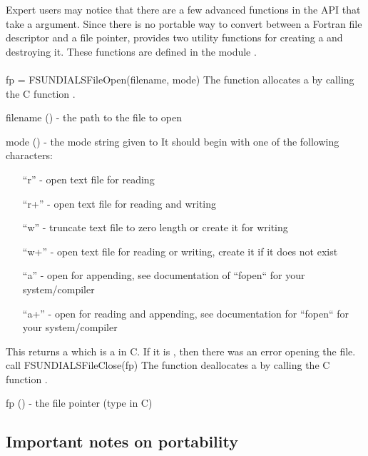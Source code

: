 Expert {\sundials} users may notice that there are a few advanced functions in the {\sundials}
{\CC} API that take a  argument. Since there is no portable way to convert between
a Fortran file descriptor and a {\CC} file pointer, {\sundials} provides two utility functions
for creating a  and destroying it. These functions are defined in the module
.
\\
\\
{
  fp = FSUNDIALSFileOpen(filename, mode)
}
{
  The function allocates a  by calling the C function .
}
{
  \begin{args}[filename]
  \item[filename] () - the path to the file to open
  \item[mode] () - the mode string given to 
    It should begin with one of the following characters:
    \begin{itemize}
      \item[] ``r'' - open text file for reading
      \item[] ``r+'' - open text file for reading and writing
      \item[] ``w''  - truncate text file to zero length or create it for writing
      \item[] ``w+'' - open text file for reading or writing, create it if it does not exist
      \item[] ``a''  - open for appending, see documentation of ``fopen`` for your system/compiler
      \item[] ``a+'' - open for reading and appending, see documentation for ``fopen`` for your system/compiler
    \end{itemize}
  \end{args}
}
{
  This returns a  which is a  in C.
  If it is , then there was an error opening the file.
}
{}
%
{
  call FSUNDIALSFileClose(fp)
}
{
  The function deallocates a  by calling the C function .
}
{
  \begin{args}[fp]
  \item[fp] () - the file pointer (type  in C)
  \end{args}
}
{}
{}

\subsection{Important notes on portability}\label{ss:f2003_portability}


